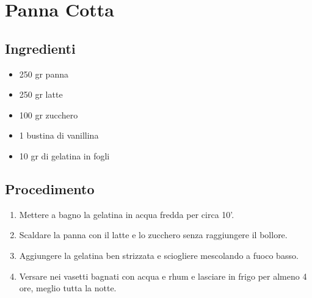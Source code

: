 \section{Panna Cotta}
\subsection{Ingredienti}
\begin{itemize}
\item 250 gr panna  
\item 250 gr latte  
\item 100 gr zucchero  
\item 1 bustina di vanillina  
\item 10 gr di gelatina in fogli
\end{itemize}
\subsection{Procedimento}
\begin{enumerate}
\item  Mettere a bagno la gelatina in acqua fredda per circa 10'.  
\item  Scaldare la panna con il latte e lo zucchero senza raggiungere il bollore.  
\item  Aggiungere la gelatina ben strizzata e sciogliere mescolando a fuoco basso.  
\item  Versare nei vasetti bagnati con acqua e rhum e lasciare in frigo per almeno 4 ore, meglio tutta la notte.
\end{enumerate}
